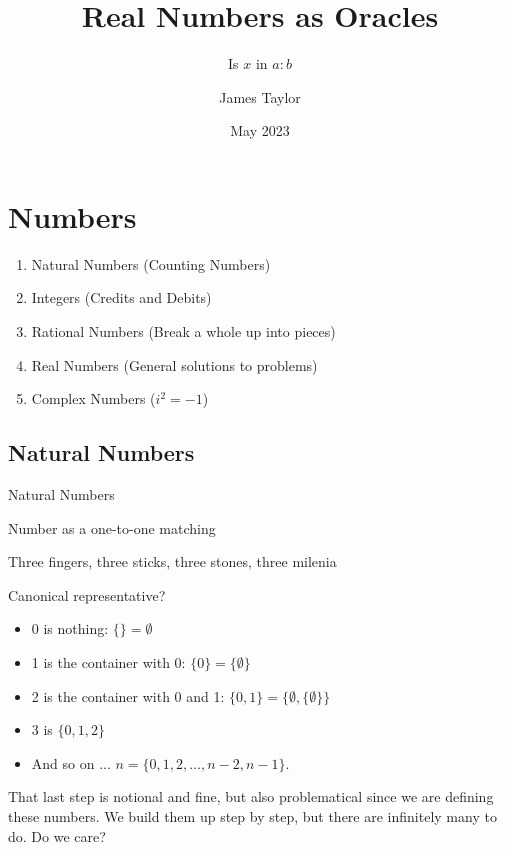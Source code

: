 \documentclass{beamer}
\title[Oracles]{Real Numbers as Oracles}
\subtitle{Is $x$ in $a:b$}
\author{James Taylor}
\institute{ratmath.com}
\date{May 2023}
\begin{document}
\begin{frame}
\titlepage
\end{frame}


\section{Numbers}

\begin{frame}

\begin{enumerate}
\item Natural Numbers (Counting Numbers)
\item Integers (Credits and Debits)
\item Rational Numbers (Break a whole up into pieces)
\item Real Numbers (General solutions to problems)
\item Complex Numbers ($i^2 = -1$)
\end{enumerate}

\end{frame}

\subsection{Natural Numbers}

\begin{frame}{Natural Numbers}

Number as a one-to-one matching

Three fingers, three sticks, three stones, three milenia

Canonical representative?

\pause

\begin{itemize}
    \item 0 is nothing:  $\{\} = \emptyset$
    \item 1 is the container with 0:  $\{0\} = \{\emptyset\}$
    \item 2 is the container with 0 and 1:  $\{0, 1\} = \{ \emptyset,\{\emptyset\} \}$
    \item 3 is $\{0, 1, 2\}$
    \item And so on ... $n = \{0, 1, 2, \ldots, n-2, n-1\}$. 
\end{itemize}

That last step is notional and fine, but also problematical since we are defining these numbers. We build them up step by step, but there are infinitely many to do. Do we care? 

\end{frame}
\end{document}
